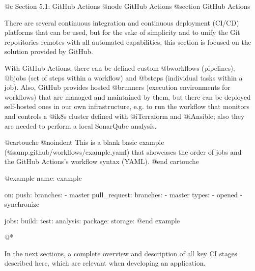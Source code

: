 @c Section 5.1: GitHub Actions
@node GitHub Actions
@section GitHub Actions

There are several continuous integration and continuous deployment (CI/CD) platforms that can be used, but for the sake of simplicity and to unify the Git repositories remotes with all automated capabilities, this section is focused on the solution provided by GitHub.

With GitHub Actions, there can be defined custom @b{workflows} (pipelines), @b{jobs} (set of steps within a workflow) and @b{steps} (individual tasks within a job). Also, GitHub provides hosted @b{runners} (execution environments for workflows) that are managed and maintained by them, but there can be deployed self-hosted ones in our own infrastructure, e.g. to run the workflow that monitors and controls a @i{k8s cluster} defined with @i{Terraform} and @i{Ansible}; also they are needed to perform a local SonarQube analysis.

@cartouche
@noindent This is a blank basic example (@samp{.github/workflows/example.yaml}) that showcases the order of jobs and the GitHub Actions's workflow syntax (YAML).
@end cartouche

@example
name: example

on:
  push:
    branches:
      - master
  pull_request:
    branches:
      - master
    types:
      - opened
      - synchronize

jobs:
  build:
  test:
  analysis:
  package:
  storage:
@end example

@*

In the next sections, a complete overview and description of all key CI stages described here, which are relevant when developing an application.
